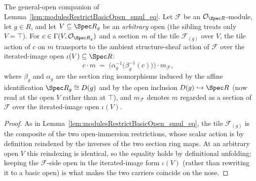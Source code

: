 \begin{lemma}\leanok
  \label{lem:modulesRestrictBasicOpen_smul_eq_genV}
  The general-open companion of Lemma~\ref{lem:modulesRestrictBasicOpen_smul_eq}. Let \(\mathcal{F}\)
  be an \(\mathcal{O}_{\Spec R}\)-module, let \(g \in R\), and let \(V \subseteq \Spec R_g\) be an
  \emph{arbitrary} open (the sibling treats only \(V = \top\)). For \(c \in \Gamma(V,
  \mathcal{O}_{\Spec R_g})\) and a section \(m\) of the tile \(\mathcal{F}_{(g)}\) over \(V\), the tile
  action of \(c\) on \(m\) transports to the ambient structure-sheaf action of \(\mathcal{F}\) over the
  iterated-image open \(\iota(V) \subseteq \Spec R\):
  \[
    c \cdot m \;=\; \bigl(\alpha_g^{-1}\bigl(\beta_g^{-1}(c)\bigr)\bigr) \cdot m_{\mathcal{F}},
  \]
  where \(\beta_g\) and \(\alpha_g\) are the section ring isomorphisms induced by the affine
  identification \(\Spec R_g \cong D(g)\) and by the open inclusion \(D(g) \hookrightarrow \Spec R\)
  (now read at the open \(V\) rather than at \(\top\)), and \(m_{\mathcal{F}}\) denotes \(m\) regarded
  as a section of \(\mathcal{F}\) over the iterated-image open \(\iota(V)\).
\end{lemma}
\begin{proof}
  \leanok
  As in Lemma~\ref{lem:modulesRestrictBasicOpen_smul_eq}, the tile \(\mathcal{F}_{(g)}\) is the
  composite of the two open-immersion restrictions, whose scalar action is by definition reindexed by
  the inverses of the two section ring maps. At an arbitrary open \(V\) this reindexing is identical, so
  the equality holds by definitional unfolding; keeping the \(\mathcal{F}\)-side open in the
  iterated-image form \(\iota(V)\) (rather than rewriting it to a basic open) is what makes the two
  carriers coincide on the nose.
\end{proof}

